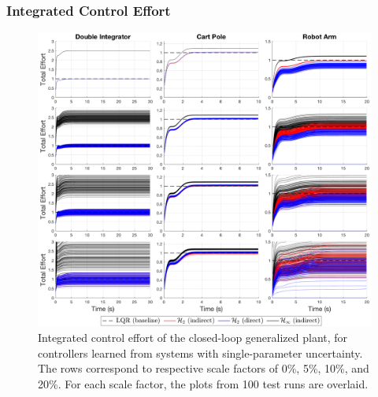 \subsubsection{Integrated Control Effort}
\begin{figure}[H]
\centering
	\includegraphics[width=\textwidth]{figures/uncertainty_integrated_effort3.png}
\caption{Integrated control effort of the closed-loop generalized plant, for controllers learned from systems with single-parameter uncertainty.  The rows correspond to respective scale factors of 0\%, 5\%, 10\%, and 20\%.  For each scale factor, the plots from 100 test runs are overlaid.}
\label{fig:uncertainty_integrated_effort3}
\end{figure}

\newpage
